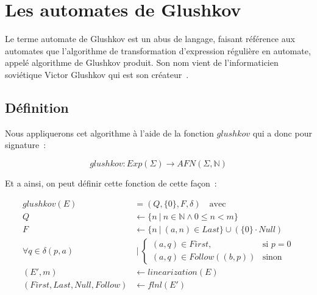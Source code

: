 \section{Les automates de Glushkov}\label{sec:glushkov}

Le terme \og{}automate de Glushkov\fg{} est un abus de langage, faisant
référence aux automates que l'algorithme de transformation d'expression
régulière en automate, appelé algorithme de Glushkov produit. Son nom vient de
l'informaticien soviétique Victor Glushkov qui est son
créateur~\cite{V_M_Glushkov_1961}.

\subsection{Définition}

Nous appliquerons cet algorithme à l'aide de la fonction \(glushkov\) qui a
donc pour signature~:

\[
    glushkov: Exp(\Sigma) \to AFN(\Sigma, \mathbb{N})
\]

Et a ainsi, on peut définir cette fonction de cette façon~:

\begin{align*}
    glushkov (E) & = (Q, \{0\}, F, \delta) \quad \text{avec}                                                                      \\
    Q & \leftarrow \{n ~|~ n \in \mathbb{N} \land 0 \leq n < m\}                                                       \\
    F & \leftarrow \{n ~|~ (a, n) \in Last\} \cup (\{0\} \cdot Null)                                                   \\
    \forall q                    \in \delta(p, a) & ~|~ \begin{cases} (a, q) \in First, & \text{si } p = 0 \\ (a, q) \in Follow((b, p)) & \text{sinon} \end{cases} \\
    (E', m)                                       & \leftarrow linearization(E)                                                                                    \\
    (First, Last, Null, Follow)                   & \leftarrow flnl(E')
\end{align*}

